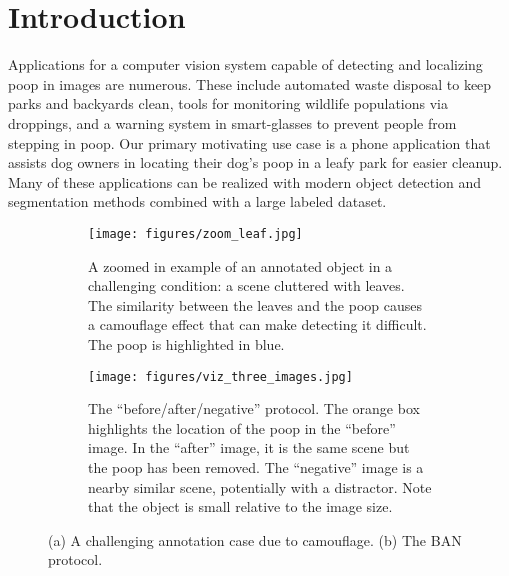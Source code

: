 \section{Introduction}
\label{sec:intro}

Applications for a computer vision system capable of detecting and localizing poop in images are numerous.
These include automated waste disposal to keep parks and backyards clean, tools for monitoring wildlife
  populations via droppings, and a warning system in smart-glasses to prevent people from stepping in poop.
Our primary motivating use case is a phone application that assists dog owners in locating their dog's poop
  in a leafy park for easier cleanup.
Many of these applications can be realized with modern object detection and segmentation methods
  \cite{sandler_mobilenetv2_2018, siam_rtseg_2018, yu_mobilenet_yolo_2023} combined with a large labeled
  dataset. 


\begin{figure}[t]
\centering
\begin{subfigure}[t]{0.49\textwidth}
    \centering
    \texttt{[image: figures/zoom\_leaf.jpg]}
    \caption[]{
        A zoomed in example of an annotated object in a challenging
        condition: a scene cluttered with leaves. The similarity between the leaves
        and the poop causes a camouflage effect that can make detecting it difficult.
        The poop is highlighted in blue.
    }
    \label{fig:HardCase}
\end{subfigure}
\hfill
\begin{subfigure}[t]{0.49\textwidth}
    \centering
    \texttt{[image: figures/viz\_three\_images.jpg]}
    \caption[]{
        The ``before/after/negative'' protocol.
        The orange box highlights the location of the poop 
        in the ``before'' image.
        In the ``after'' image, it is the same scene but the poop has been removed.
        The ``negative'' image is a nearby similar scene, potentially with a distractor.
        Note that the object is small relative to the image size.
    }
    \label{fig:ThreeImages}
\end{subfigure}
\caption{(a) A challenging annotation case due to camouflage. (b) The BAN protocol.}
\label{fig:Combined}
\end{figure}
  

